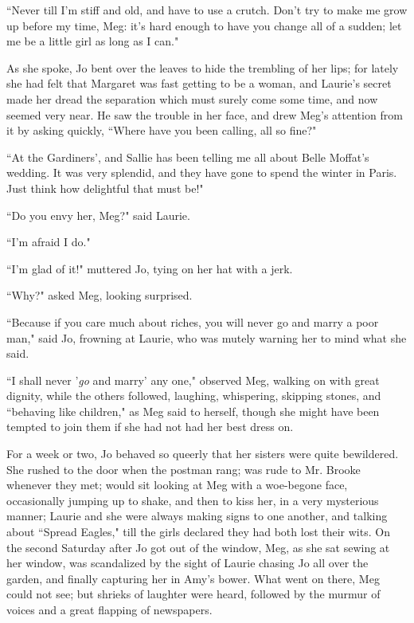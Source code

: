``Never till I'm stiff and old, and have to use a crutch.
Don't try to make me grow up before my time, Meg:
it's hard enough to have you change all of a sudden; let
me be a little girl as long as I can."

As she spoke, Jo bent over the leaves to hide the trembling of her lips;
for lately she had felt that Margaret was fast getting to be a woman,
and Laurie's secret made her dread the separation which
must surely come some time, and now seemed very near. He saw the trouble
in her face, and drew Meg's attention from it by asking
quickly, ``Where have you been calling, all so fine?"

``At the Gardiners', and Sallie has been telling me all
about Belle Moffat's wedding. It was very splendid, and
they have gone to spend the winter in Paris. Just think how delightful
that must be!"

``Do you envy her, Meg?" said Laurie.

``I'm afraid I do."

``I'm glad of it!" muttered Jo, tying on her hat with a
jerk.

``Why?" asked Meg, looking surprised.

``Because if you care much about riches, you will never go and marry a
poor man," said Jo, frowning at Laurie, who was mutely warning her to
mind what she said.

``I shall never '\emph{go} and marry'
any one," observed Meg, walking on with great dignity, while the others
followed, laughing, whispering, skipping stones, and ``behaving like
children," as Meg said to herself, though she might have been tempted to
join them if she had not had her best dress on.

For a week or two, Jo behaved so queerly that her sisters were quite
bewildered. She rushed to the door when the postman rang; was rude to
Mr. Brooke whenever they met; would sit looking at Meg with a woe-begone
face, occasionally jumping up to shake, and then to kiss her, in a very
mysterious manner; Laurie and she were always making signs to one
another, and talking about ``Spread Eagles," till the girls declared they
had both lost their wits. On the second Saturday after Jo got out of the
window, Meg, as she sat sewing at her window, was scandalized by the
sight of Laurie chasing Jo all over the garden, and finally capturing
her in Amy's bower. What went on there, Meg could not
see; but shrieks of laughter were heard, followed by the murmur of
voices and a great flapping of newspapers.

